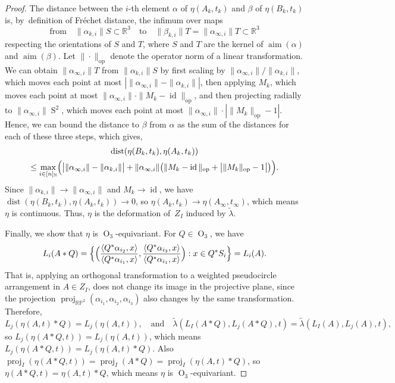 \documentclass[JEP,XML,SOM,Unicode,NoFloatCountersInSection,published]{cedram}
\newcommand{\quand}{\quad\text{and}\quad}
\theoremstyle{remark}
\let\mb\mathbb
\DeclareMathOperator{\dist}{dist}
\DeclareMathOperator{\orth}{O}
\DeclareMathOperator{\sphere}{S}
\DeclareMathOperator{\aim}{aim}
\DeclareMathOperator{\proj}{proj}
\DeclareMathOperator{\id}{id}
\newcommand{\projplane}{\mb{RP}^2}
\begin{document}
\begin{proof}
The distance between the $i$-th element $\alpha$ of $\eta(A_k,t_k)$ and $\beta$ of $\eta(B_k,t_k)$ is, by~definition of Fréchet distance, the infimum over maps
\[
\text{from}\quad\|\alpha_{k,i}\|S \subset \mb{R}^3\quad\text{to}\quad\|\beta_{k,i}\|T = \|\alpha_{\infty,i}\|T \subset \mb{R}^3
\]
respecting the orientations of $S$ and $T$, where $S$ and $T$ are the kernel of $\aim(\alpha)$ and $\aim(\beta)$.
Let $\|\cdot\|_\text{op}$ denote the operator norm of a linear transformation.
We can obtain $\|\alpha_{\infty,i}\|T$ from $\|\alpha_{k,i}\|S$ by first scaling by $\|\alpha_{\infty,i}\|/\|\alpha_{k,i}\|$, which moves each point at most $\left| \| \alpha_{\infty,i} \| - \| \alpha_{k,i} \| \right|$, then applying $M_k$, which moves each point at most $\| \alpha_{\infty,i} \| \cdot \|M_k -\id \|_{\textrm{op}}$, and then projecting radially to $\|\alpha_{\infty,i}\| \sphere^2$, which moves each point at most $\| \alpha_{\infty,i} \| \cdot | \|M_k \|_{\textrm{op}} -1 |$. Hence, we can bound the distance to $\beta$ from $\alpha$ as the sum of the distances for each of these three steps, which gives,
\begin{multline*}
\dist(\eta(B_k,t_k), \eta(A_k,t_k))\\
\leq \max_{i \in [n]_\mb{N}} \Bigl( \bigl| \| \alpha_{\infty,i} \| - \| \alpha_{k,i} \| \bigr| +\| \alpha_{\infty,i} \| \bigl( \|M_k -\id \|_{\textrm{op}} +\bigl| \|M_k \|_{\textrm{op}} -1 \bigr| \bigr) \Bigr).
\end{multline*}
Since $\|\alpha_{k,i}\| \to \|\alpha_{\infty,i}\|$ and $M_k \to \id$, we have $\dist(\eta(B_k,t_k), \eta(A_k,t_k)) \to 0$, so
$\eta(A_k,t_k) \to \eta(A_\infty,t_\infty)$, which means $\eta$ is continuous.
Thus, $\eta$ is the deformation of~$Z_I$ induced by $\tilde \lambda$.

Finally, we show that $\eta$ is $\orth_3$-equivariant. For $Q \in \orth_3$, we have
\begin{align*}
L_i(A*Q)
= \Bigl\{ \Bigl( \frac{\langle Q^*\alpha_{i_2}, x \rangle}{\langle Q^*\alpha_{i_1}, x \rangle}, \frac{\langle Q^*\alpha_{i_3}, x \rangle}{\langle Q^*\alpha_{i_1}, x \rangle} \Bigr) :x \in Q^* S_i \Bigr\}
= L_i(A).
\end{align*}
That is, applying an orthogonal transformation to a weighted pseudocircle arrangement in $A \in Z_I$, does not change its image in the projective plane, since the projection $\proj_{\projplane}(\alpha_{i_1},\alpha_{i_2},\alpha_{i_3})$ also changes by the same transformation.
Therefore,
\[
L_j(\eta(A,t)*Q) = L_j(\eta(A,t)),\quand \tilde \lambda(L_I(A*Q),L_j(A*Q),t) = \tilde \lambda(L_I(A),L_j(A),t),
\]
so $L_j(\eta(A*Q,t)) = L_j(\eta(A,t))$, which means $L_j(\eta(A*Q,t)) = L_j(\eta(A,t)*Q)$.
Also $\proj_I(\eta(A*Q,t)) = \proj_I(A*Q) = \proj_I(\eta(A,t)*Q)$,
so $\eta(A*Q,t) = \eta(A,t)*Q$, which means $\eta$ is $\orth_3$-equivariant.
\end{proof}
\end{document}

